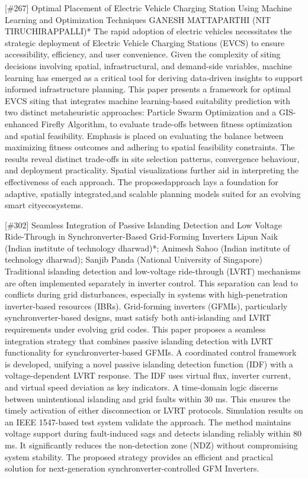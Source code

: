 {} \begin{abstract_online} {[\#267] Optimal Placement of Electric Vehicle Charging Station Using Machine Learning and Optimization Techniques} {} {GANESH  MATTAPARTHI (NIT TIRUCHIRAPPALLI)*} {} The rapid adoption of electric vehicles necessitates the strategic deployment of Electric Vehicle Charging Stations (EVCS) to ensure accessibility, efficiency, and user convenience. Given the complexity of siting decisions involving spatial, infrastructural, and demand-side variables, machine learning has emerged as a critical tool for deriving data-driven insights to support informed infrastructure planning. This paper presents a framework for optimal EVCS siting that integrates machine learning-based suitability prediction with two distinct metaheuristic approaches: Particle Swarm Optimization and a GIS-enhanced Firefly Algorithm, to evaluate trade-offs between fitness optimization and spatial feasibility. Emphasis is placed on evaluating the balance between maximizing fitness outcomes and adhering to spatial feasibility constraints. The results reveal distinct trade-offs in site selection patterns, convergence behaviour, and deployment practicality. Spatial visualizations further aid in interpreting the effectiveness of each approach. The proposedapproach lays a foundation for adaptive, spatially integrated,and scalable planning models suited for an evolving smart cityecosystems. \end{abstract_online} 
{} \begin{abstract_online} {[\#302] Seamless Integration of Passive Islanding Detection and Low Voltage Ride-Through in Synchronverter-Based Grid-Forming Inverters} {} {Lipun Naik (Indian institute of technology dharwad)*; Animesh Sahoo (Indian institute of technology dharwad); Sanjib Panda (National University of Singapore)} {} Traditional islanding detection and low-voltage ride-through (LVRT) mechanisms are often implemented separately in inverter control. This separation can lead to conflicts during grid disturbances, especially in systems with high-penetration inverter-based resources (IBRs). Grid-forming inverters (GFMIs), particularly synchronverter-based designs, must satisfy both anti-islanding and LVRT requirements under evolving grid codes. This paper proposes a seamless integration strategy that combines passive islanding detection with LVRT functionality for synchronverter-based GFMIs. A coordinated control framework is developed, unifying a novel passive islanding detection function (IDF) with a voltage-dependent LVRT response. The IDF uses virtual flux, inverter current, and virtual speed deviation as key indicators. A time-domain logic discerns between unintentional islanding and grid faults within 30 ms. This ensures the timely activation of either disconnection or LVRT protocols. Simulation results on an IEEE 1547-based test system validate the approach. The method maintains voltage support during fault-induced sags and detects islanding reliably within 80 ms. It significantly reduces the non-detection zone (NDZ) without compromising system stability. The proposed strategy provides an efficient and practical solution for next-generation synchronverter-controlled GFM Inverters. \end{abstract_online} 

